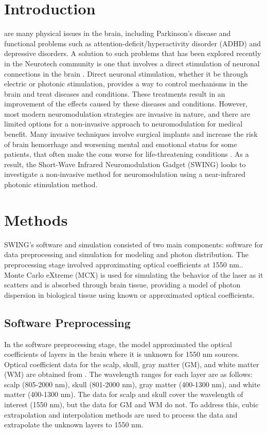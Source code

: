 \documentclass[journal,twoside,web]{ieeecolor}
\begin{document}
\section{Introduction}
\label{sec:introduction}
 are many physical issues in the brain, including Parkinson's disease and functional 
problems such as attention-deficit/hyperactivity disorder (ADHD) and depressive disorders. 
A solution to such problems that has been explored recently in the Neurotech community is one that involves a direct stimulation of  
neuronal connections in the brain \cite{b1,b2,b3}. Direct neuronal stimulation, whether it be through electric or photonic 
stimulation, provides a way to control mechanisms in the brain and treat diseases and conditions. These treatments result 
in an improvement of the effects caused by these diseases and conditions. However, most modern neuromodulation strategies 
are invasive in nature, and there are limited options for a non-invasive approach to neuromodulation for medical benefit. Many invasive 
techniques involve surgical implants and increase the risk of brain hemorrhage and worsening mental and emotional status for some patients,  
that often make the cons worse for life-threatening conditions \cite{b1,b4}. As a result, the Short-Wave Infrared Neuromodulation Gadget (SWING) 
looks to investigate a non-invasive method for neuromodulation using a near-infrared photonic stimulation method. 


\section{Methods}
\label{sec:methods}
SWING's software and simulation consisted of two main components: software for data preprocessing and simulation for modeling and photon distribution. 
The preprocessing stage involved approximating optical coefficients at 1550 nm.. Monte Carlo eXtreme (MCX) is used for simulating the 
behavior of the laser as it scatters and is absorbed through brain tissue, providing a model of photon dispersion in biological tissue using known or 
approximated optical coefficients.

\subsection{Software Preprocessing}
In the software preprocessing stage, the model approximated the optical coefficients of layers in the brain where it is unknown for 1550 nm sources. 
Optical coefficient data for the scalp, skull, gray matter (GM), and white matter (WM) are obtained from \cite{b5}. The wavelength ranges for each layer are as follows: 
scalp (805-2000 nm), skull (801-2000 nm), gray matter (400-1300 nm), and white matter (400-1300 nm). The data for scalp and skull cover the wavelength of interest 
(1550 nm), but the data for GM and WM do not. To address this, cubic extrapolation and interpolation methods are used to process the data and extrapolate the 
unknown layers to 1550 nm. 
\end{document}
